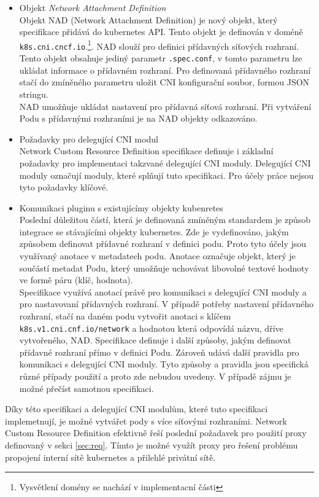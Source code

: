 \begin{itemize}
    \item Objekt \textit{Network Attachment Definition}\\
    Objekt NAD (Network Attachment Definition) je nový objekt, který specifikace přidává do kubernetes API. Tento objekt je definován v doméně \verb|k8s.cni.cncf.io|.\footnote{Vysvětlení domény se nachází v implementacní části}. NAD slouží pro definici přídavných síťových rozhraní. Tento objekt obsahuje jediný parametr \verb|.spec.conf|, v tomto parametru lze ukládat informace o přídavném rozhraní. Pro definovaná přídavného rozhraní stačí do zmíněného parametru uložit CNI konfigurační soubor, formou JSON stringu.\\
    NAD umožňuje ukládat nastavení pro přídavná síťová rozhraní. Při vytváření Podu s přídavnými rozhraními je na NAD objekty odkazováno.
    \item Požadavky pro delegující CNI modul\\
    Network Custom Resource Definition specifikace definuje i základní požadavky pro implementaci takzvané delegující CNI moduly. Delegující CNI moduly označují moduly, které splňují tuto specifikaci. Pro účely práce nejsou tyto požadavky klíčové.    
    \item Komunikaci pluginu s existujícímy objekty kubenretes\\
    Poslední důležitou částí, která je definovaná zmíněným standardem je způsob integrace se stávajícími objekty kubernetes. Zde je vydefinováno, jakým způsobem definovat přídavné rozhraní v definici podu. Proto tyto účely jsou využívaný anotace v metadatech podu. Anotace označuje objekt, který je součástí metadat Podu, který umožňuje uchovávat libovolné textové hodnoty ve formě páru (klíč, hodnota).\\
    Specifikace využívá anotací právě pro komunikaci s delegující CNI moduly a pro nastavovaní přídavných rozhraní. V případě potřeby nastavení přídavného rozhraní, stačí na daném podu vytvořit anotaci s klíčem \verb|k8s.v1.cni.cnf.io/network| a hodnotou která odpovídá názvu, dříve vytvořeného, NAD.
    Specifikace definuje i další způsoby, jakým definovat přídavné rozhraní přímo v definici Podu. Zároveň udává další pravidla pro komunikaci s delegující CNI moduly. Tyto způsoby a pravidla jsou specifická různé případy použití a proto zde nebudou uvedeny. V případě zájmu je možné přečíst samotnou specifikaci. 
\end{itemize}
Díky této specifikaci a delegující CNI modulům, které tuto specifikaci implemetnují, je možné vytvářet pody s více síťovými rozhraními. Network Custom Resource Definition efektivně řeší poslední požadavek pro použití proxy definovaný v sekci \ref{sec:req}. Tímto je možné využít proxy pro řešení problému propojení interní sítě kubernetes a přilehlé privátní sítě.
